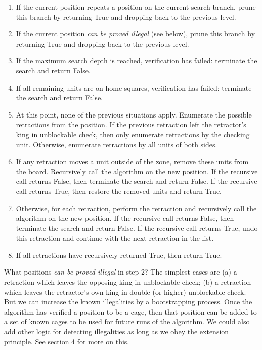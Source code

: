 \documentclass[11pt]{article}
\begin{document}
\begin{enumerate}
\item{If the current position repeats a position on the current search branch, prune this branch by returning True and dropping back to the previous level.}
\item{If the current position {\em can be proved illegal} (see below), prune this branch by returning True and dropping back to the previous level.}
\item{If the maximum search depth is reached, verification has failed: terminate the search and return False.}
\item{If all remaining units are on home squares, verification has failed: terminate the search and return False.}
\item{At this point, none of the previous situations apply. Enumerate the possible retractions from the position. If the previous retraction left the retractor's king in unblockable check, then only enumerate retractions by the checking unit. Otherwise, enumerate retractions by all units of both sides.}
\item{If any retraction moves a unit outside of the zone, remove these units from the board. Recursively call the algorithm on the new position. If the recursive call returns False, then terminate the search and return False. If the recursive call returns True, then restore the removed units and return True.}
\item{Otherwise, for each retraction, perform the retraction and recursively call the algorithm on the new position. If the recursive call returns False, then terminate the search and return False.  If the recursive call returns True, undo this retraction and continue with the next retraction in the list.}
\item{If all retractions have recursively returned True, then return True.}
\end{enumerate} 

What positions {\em can be proved illegal} in step 2? The simplest cases are (a) a retraction which leaves the opposing king in unblockable check; (b) a retraction which leaves the retractor's own king in double (or higher) unblockable check. But we can increase the known illegalities by a bootstrapping process. Once the algorithm has verified a position to be a cage, then that position can be added to a set of known cages to be used for future runs of the algorithm. We could also add other logic for detecting illegalities as long as we obey the extension principle. See section 4 for more on this.
\end{document}
